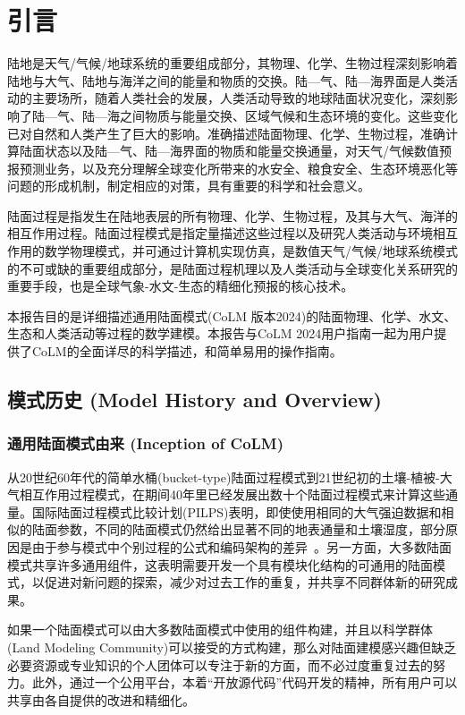\chapter{引言}

陆地是天气/气候/地球系统的重要组成部分，其物理、化学、生物过程深刻影响着陆地与大气、陆地与海洋之间的能量和物质的交换。陆—气、陆—海界面是人类活动的主要场所，随着人类社会的发展，人类活动导致的地球陆面状况变化，深刻影响了陆—气、陆—海之间物质与能量交换、区域气候和生态环境的变化。这些变化已对自然和人类产生了巨大的影响。准确描述陆面物理、化学、生物过程，准确计算陆面状态以及陆—气、陆—海界面的物质和能量交换通量，对天气/气候数值预报预测业务，以及充分理解全球变化所带来的水安全、粮食安全、生态环境恶化等问题的形成机制，制定相应的对策，具有重要的科学和社会意义。

陆面过程是指发生在陆地表层的所有物理、化学、生物过程，及其与大气、海洋的相互作用过程。陆面过程模式是指定量描述这些过程以及研究人类活动与环境相互作用的数学物理模式，并可通过计算机实现仿真，是数值天气/气候/地球系统模式的不可或缺的重要组成部分，是陆面过程机理以及人类活动与全球变化关系研究的重要手段，也是全球气象-水文-生态的精细化预报的核心技术。

本报告目的是详细描述通用陆面模式(CoLM 版本2024)的陆面物理、化学、水文、生态和人类活动等过程的数学建模。本报告与CoLM 2024用户指南一起为用户提供了CoLM的全面详尽的科学描述，和简单易用的操作指南。


\section{模式历史 (Model History and Overview)}

\subsection{通用陆面模式由来 (Inception of CoLM)}
从20世纪60年代的简单水桶(bucket-type)陆面过程模式到21世纪初的土壤-植被-大气相互作用过程模式，在期间40年里已经发展出数十个陆面过程模式来计算这些通量。国际陆面过程模式比较计划(PILPS)表明，即使使用相同的大气强迫数据和相似的陆面参数，不同的陆面模式仍然给出显著不同的地表通量和土壤湿度，部分原因是由于参与模式中个别过程的公式和编码架构的差异~\citep{Henderson-Sellers_95}。另一方面，大多数陆面模式共享许多通用组件，这表明需要开发一个具有模块化结构的可通用的陆面模式，以促进对新问题的探索，减少对过去工作的重复，并共享不同群体新的研究成果。

如果一个陆面模式可以由大多数陆面模式中使用的组件构建，并且以科学群体(Land Modeling Community)可以接受的方式构建，那么对陆面建模感兴趣但缺乏必要资源或专业知识的个人团体可以专注于新的方面，而不必过度重复过去的努力。此外，通过一个公用平台，本着“开放源代码”代码开发的精神，所有用户可以共享由各自提供的改进和精细化。

